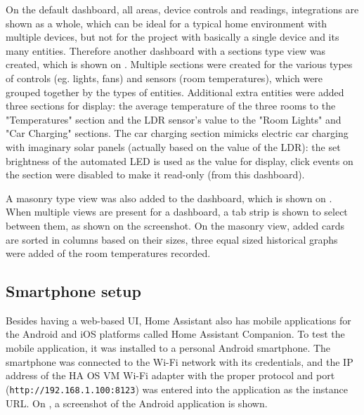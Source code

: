 On the default dashboard, all areas, device controls and readings, integrations are shown as a whole, which can be ideal for a typical home environment with multiple devices, but not for the project with basically a single device and its many entities. Therefore another dashboard with a sections type view was created, which is shown on . Multiple sections were created for the various types of controls (eg. lights, fans) and sensors (room temperatures), which were grouped together by the types of entities. Additional extra entities were added three sections for display: the average temperature of the three rooms to the "Temperatures" section and the LDR sensor's value to the "Room Lights" and "Car Charging" sections. The car charging section mimicks electric car charging with imaginary solar panels (actually based on the value of the LDR): the set brightness of the automated LED is used as the value for display, click events on the section were disabled to make it read-only (from this dashboard).

A masonry type view was also added to the dashboard, which is shown on . When multiple views are present for a dashboard, a tab strip is shown to select between them, as shown on the screenshot. On the masonry view, added cards are sorted in columns based on their sizes, three equal sized historical graphs were added of the room temperatures recorded.

\subsection{Smartphone setup}

Besides having a web-based UI, Home Assistant also has mobile applications for the Android and iOS platforms called Home Assistant Companion. \cite{HACompanion} To test the mobile application, it was installed to a personal Android smartphone. The smartphone was connected to the Wi-Fi network with its credentials, and the IP address of the HA OS VM Wi-Fi adapter with the proper protocol and port (\verb+http://192.168.1.100:8123+) was entered into the application as the instance URL. On , a screenshot of the Android application is shown.

